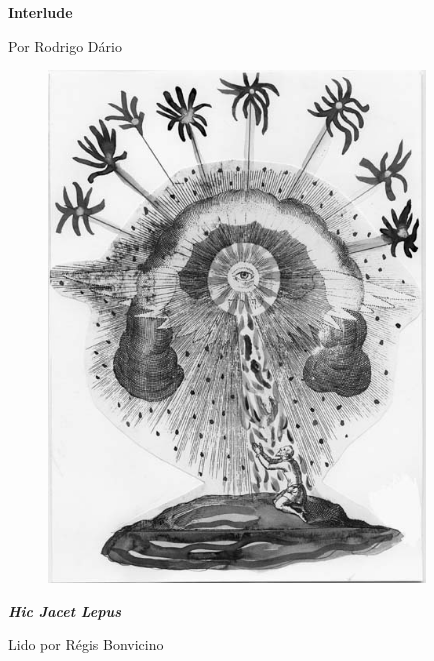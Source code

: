 \begin{absolutelynopagebreak}
\textbf{Interlude}

Por Rodrigo Dário

\thispagestyle{empty}

\begin{vplace}
\begin{figure}[H]
  \centering
  \vspace*{4cm}
  \includegraphics[width=100mm]{./imgs/caparc5.JPG}  

\end{figure}
\end{vplace}

\end{absolutelynopagebreak}

\pagebreak

\textbf{\emph{Hic Jacet Lepus}}

Lido por Régis Bonvicino

